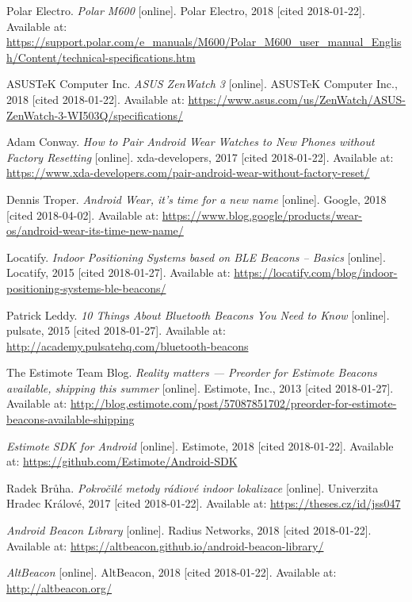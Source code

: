 \begin{thebibliography}{10}
Polar Electro. \textit{Polar M600} [online]. Polar Electro, 2018 [cited 2018-01-22]. Available at: \url{https://support.polar.com/e_manuals/M600/Polar_M600_user_manual_English/Content/technical-specifications.htm}

ASUSTeK Computer Inc. \textit{ASUS ZenWatch 3} [online]. ASUSTeK Computer Inc., 2018 [cited 2018-01-22]. Available at: \url{https://www.asus.com/us/ZenWatch/ASUS-ZenWatch-3-WI503Q/specifications/}

Adam Conway. \textit{How to Pair Android Wear Watches to New Phones without Factory Resetting} [online]. xda-developers, 2017 [cited 2018-01-22]. Available at: \url{https://www.xda-developers.com/pair-android-wear-without-factory-reset/}

Dennis Troper. \textit{Android Wear, it’s time for a new name} [online]. Google, 2018 [cited 2018-04-02]. Available at: \url{https://www.blog.google/products/wear-os/android-wear-its-time-new-name/}

Locatify. \textit{Indoor Positioning Systems based on BLE Beacons – Basics} [online]. Locatify, 2015 [cited 2018-01-27]. Available at: \url{https://locatify.com/blog/indoor-positioning-systems-ble-beacons/}

Patrick Leddy. \textit{10 Things About Bluetooth Beacons You Need to Know} [online]. pulsate, 2015 [cited 2018-01-27]. Available at: \url{http://academy.pulsatehq.com/bluetooth-beacons}

The Estimote Team Blog. \textit{Reality matters — Preorder for Estimote Beacons available, shipping this summer} [online]. Estimote, Inc., 2013 [cited 2018-01-27]. Available at: \url{http://blog.estimote.com/post/57087851702/preorder-for-estimote-beacons-available-shipping}

\textit{Estimote SDK for Android} [online]. Estimote, 2018 [cited 2018-01-22]. Available at: \url{https://github.com/Estimote/Android-SDK}

Radek Brůha. \textit{Pokročilé metody rádiové indoor lokalizace} [online]. Univerzita Hradec Králové, 2017 [cited 2018-01-22]. Available at: \url{https://theses.cz/id/jss047}

\textit{Android Beacon Library} [online]. Radius Networks, 2018 [cited 2018-01-22]. Available at: \url{https://altbeacon.github.io/android-beacon-library/}

\textit{AltBeacon} [online]. AltBeacon, 2018 [cited 2018-01-22]. Available at: \url{http://altbeacon.org/}


\end{thebibliography}
